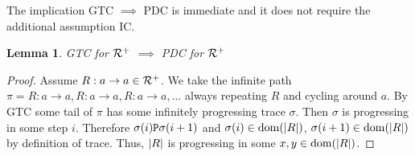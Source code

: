 \documentclass{lmcs}
\newtheorem{lemma}[theorem]{Lemma}
\begin{document}
%
%

The implication GTC $\implies$ PDC is immediate and it does not require the 
additional assumption IC.

\begin{lemma}
GTC for ${\mathcal R}^+$ $\implies$  PDC for ${\mathcal R}^+$
\end{lemma}

\begin{proof}
Assume $R:a \rightarrow a \in {\mathcal R}^+$. We take the infinite path $\pi = R:a \rightarrow a, R:a \rightarrow a, R:a \rightarrow a,\ldots$ always repeating $R$ and cycling around $a$. By GTC some tail of $\pi$ has some infinitely progressing trace $\sigma$. Then $\sigma$ is progressing in some step $i$. Therefore $\sigma(i) {\tt P} \sigma(i+1)$ and $\sigma(i) \in {\rm dom}({| R |})$, $\sigma(i+1) \in {\rm dom}({| R |})$ by definition of trace. Thus, ${| R |}$ is progressing in some $x, y \in {\rm dom}({| R |})$. 
\end{proof}
\end{document}
